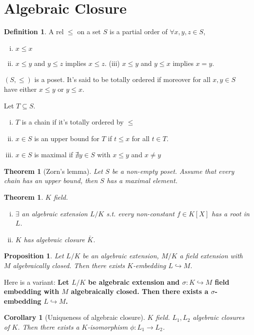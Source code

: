 \documentclass{article}
\theoremstyle{definition}
\newtheorem*{defn*}{Definition}
\theoremstyle{remark}
\theoremstyle{plain}
\newtheorem{thm}[defn]{Theorem}
\newtheorem{prop}[defn]{Proposition}
\newtheorem{crly}[defn]{Corollary}
\begin{document}
\section{Algebraic Closure}
\begin{defn*}
    A rel $\le $ on a set $S$ is a partial order of $\forall x,y,z\in S$, \begin{enumerate}[(i)]
        \item $x\le x$ \item $x\le y$ and $y\le z$ implies $x\le z$. (iii) $x\le y$ and $y\le x$ implies $x=y$.
    \end{enumerate}
    $(S,\le )$ is a poset.
    It's said to be totally ordered if moreover for all $x,y\in S$ have either $x\le y$ or $y\le x$.

    Let $T\subseteq S$.
    \begin{enumerate}[(i)]
        \item $T$ is a chain if it's totally ordered by $\le$
        \item $x\in S$ is an upper bound for $T$ if $t\le x$ for all $t\in T$.
        \item $x\in S$ is maximal if $\nexists y\in S$ with $x\le y$ and $x\neq y$
    \end{enumerate}
\end{defn*}
\begin{thm}[Zorn's lemma]
    Let $S$ be a non-empty poset. Assume that every chain has an upper bound, then $S$ has a maximal element.
\end{thm}
\begin{thm}
    $K$ field.
    \begin{enumerate}[(i)]
        \item $\exists$ an algebraic extension $L/K$ s.t. every non-constant $f\in K[X]$ has a root in $L$.
        \item $K$ has algebraic closure $\bar K$.
    \end{enumerate}
\end{thm}
\begin{prop}
    Let $L/K$ be an algebraic extension, $M/K$ a field extension with $M$ algebraically closed. Then there exists $K$-embedding $L\hookrightarrow M$.
\end{prop}
Here is a variant:
\textbf{Let $L/K$ be algebraic extension and $\sigma:K\hookrightarrow M$ field embedding with $M$ algebraically closed. Then there exists a $\sigma$-embedding $L\hookrightarrow M$.}
\begin{crly}[Uniqueness of algebraic closure]
    $K$ field. $L_1,L_2$ algebraic closures of $K$. Then there exists a $K$-isomorphism $\phi:L_1\to L_2$.
\end{crly}
\end{document}
